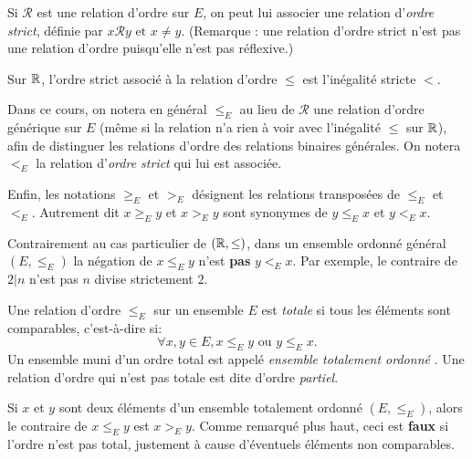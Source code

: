 \begin{definition}
Si ${\mathcal R}$ est une relation d'ordre sur $E$, on peut lui associer une relation d'\emph{ordre strict}, définie par \og$ x{\mathcal R}y\text{ et }x\neq y$\fg. (Remarque : une relation d'ordre strict n'est pas une relation d'ordre puisqu'elle n'est pas réflexive.)
\end{definition}

\begin{exemple}
Sur $\mathbb{R}$, l'ordre strict associé à la relation d'ordre $\leq$ est l'inégalité stricte $<$.
\end{exemple}


Dans ce cours, on notera en général $\leq_E$ au lieu de ${\mathcal R}$ une relation d'ordre générique sur $E$ (même si la relation n'a rien à voir avec l'inégalité $\leq$ sur $\mathbb{R}$), afin de distinguer les relations d'ordre des relations binaires générales. On notera $<_E$ la relation d'\emph{ordre strict} qui lui est associée.

Enfin, les notations $\geq_E$ et $>_E$ désignent les relations transposées de $\leq_E$ et $<_E$. Autrement dit  $x \geq_E y$ et $x >_E y$ sont synonymes de $y \leq_E x$ et $y <_E x$.

\begin{attention}
Contrairement au cas particulier de $(\mathbb{R},\leq)$, dans un ensemble ordonné général $(E,\leq_E)$ la négation de \og $x\leq_E y$\fg{} n'est \textbf{pas} \og $y<_E x$\fg. Par exemple, le contraire de \og$2|n$\fg{} n'est pas \og$n$ divise strictement $2$.\fg{}
\end{attention}

\begin{definition}
Une relation d'ordre $\leq_E$ sur un ensemble $E$ est \emph{totale} si tous les éléments sont comparables, c'est-à-dire si:
\[ \forall x, y\in E, x\leq_Ey\text{ ou } y\leq_E x.\]
Un ensemble muni d'un ordre total est appelé \emph{ensemble totalement ordonné} . Une relation d'ordre qui n'est pas totale est dite d'ordre \emph{partiel}.
\end{definition}

\begin{remarque}
Si $x$ et $y$ sont deux éléments d'un ensemble totalement ordonné $(E,\leq_E)$, alors le contraire de $x\leq_E y$ est $x>_E y$. Comme remarqué plus haut, ceci est \textbf{faux} si l'ordre n'est pas total, justement à cause d'éventuels éléments non comparables. 
\end{remarque}

